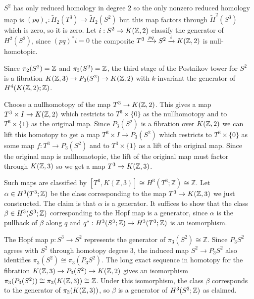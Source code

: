 \documentclass[12pt]{article}
\begin{document}
\begin{solution}
    $S^2$ has only reduced homology in degree $2$ so the only nonzero reduced homology map is $(pq)_*: \tilde{H}_2(T^3)\to \tilde{H}_2(S^2)$ but this map factors through $\tilde{H}^2(S^3)$ which is zero, so it is zero. Let $i:S^2\to K(\mathbb{Z},2)$ classify the generator of $H^2(S^2)$, since $(pq)^*i = 0$ the composite $T^3\xrightarrow{pq} S^2\xrightarrow{i} K(\mathbb{Z},2)$ is null-homotopic. 

    Since $\pi_2(S^2) = \mathbb{Z}$ and $\pi_3(S^2) = \mathbb{Z}$, the third stage of the Postnikov tower for $S^2$ is a fibration $K(\mathbb{Z},3)\to P_3(S^2)\to K(\mathbb{Z},2)$ with $k$-invariant the generator of $H^4(K(\mathbb{Z},2);\mathbb{Z})$. 

    Choose a nullhomotopy of the map $T^3 \to K(\mathbb{Z},2)$. This gives a map $T^3\times I\to K(\mathbb{Z},2)$ which restricts to $T^3\times \{0\}$ as the nullhomotopy and to $T^3\times \{1\}$ as the original map. Since $P_3(S^2)$ is a fibration over $K(\mathbb{Z},2)$ we can lift this homotopy to get a map $T^3\times I\to P_3(S^2)$ which restricts to $T^3\times \{0\}$ as some map $f:T^3\to P_3(S^2)$ and to $T^3\times \{1\}$ as a lift of the original map. Since the original map is nullhomotopic, the lift of the original map must factor through $K(\mathbb{Z},3)$ so we get a map $T^3\to K(\mathbb{Z},3)$.

    Such maps are classified by $[T^3,K(\mathbb Z,3)]\cong H^3(T^3;\mathbb Z)\cong \mathbb Z$. Let $\alpha\in H^3(T^3;\mathbb{Z})$ be the class corresponding to the map $T^3\to K(\mathbb{Z},3)$ we just constructed. The claim is that $\alpha$ is a generator. It suffices to show that the class $\beta\in H^3(S^3;\mathbb{Z})$ corresponding to the Hopf map is a generator, since $\alpha$ is the pullback of $\beta$ along $q$ and $q^*:H^3(S^3;\mathbb{Z})\to H^3(T^3;\mathbb{Z})$ is an isomorphism.

    The Hopf map $p:S^3\to S^2$ represents the generator of $\pi_3(S^2)\cong \mathbb Z$. Since $P_3S^2$ agrees with $S^2$ through homotopy degree $3$, the induced map $S^2\to P_3S^2$ also identifies $\pi_3(S^2)\cong \pi_3(P_3S^2)$. The long exact sequence in homotopy for the fibration $K(\mathbb{Z},3)\to P_3(S^2)\to K(\mathbb{Z},2)$ gives an isomorphism $\pi_3(P_3(S^2))\cong \pi_3(K(\mathbb{Z},3))\cong \mathbb{Z}$. Under this isomorphism, the class $\beta$ corresponds to the generator of $\pi_3(K(\mathbb{Z},3))$, so $\beta$ is a generator of $H^3(S^3;\mathbb{Z})$ as claimed.


\end{solution}
\end{document}

